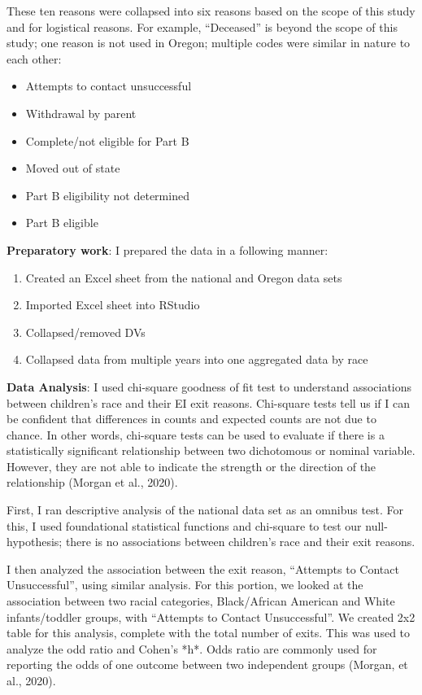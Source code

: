 \documentclass[
  letterpaper,
  DIV=11,
  numbers=noendperiod]{scrartcl}
\providecommand{\tightlist}{%
  \setlength{\itemsep}{0pt}\setlength{\parskip}{0pt}}\usepackage{longtable,booktabs,array}
\begin{document}
These ten reasons were collapsed into six reasons based on the scope of
this study and for logistical reasons. For example, ``Deceased'' is
beyond the scope of this study; one reason is not used in Oregon;
multiple codes were similar in nature to each other:

\begin{itemize}
\tightlist
\item
  Attempts to contact unsuccessful
\item
  Withdrawal by parent
\item
  Complete/not eligible for Part B
\item
  Moved out of state
\item
  Part B eligibility not determined
\item
  Part B eligible
\end{itemize}

\textbf{Preparatory work}: I prepared the data in a following manner:

\begin{enumerate}
\def\labelenumi{\arabic{enumi}.}
\tightlist
\item
  Created an Excel sheet from the national and Oregon data sets
\item
  Imported Excel sheet into RStudio
\item
  Collapsed/removed DVs
\item
  Collapsed data from multiple years into one aggregated data by race
\end{enumerate}

\textbf{Data Analysis}: I used chi-square goodness of fit test to
understand associations between children's race and their EI exit
reasons. Chi-square tests tell us if I can be confident that differences
in counts and expected counts are not due to chance. In other words,
chi-square tests can be used to evaluate if there is a statistically
significant relationship between two dichotomous or nominal variable.
However, they are not able to indicate the strength or the direction of
the relationship (Morgan et al., 2020).

First, I ran descriptive analysis of the national data set as an omnibus
test. For this, I used foundational statistical functions and chi-square
to test our null-hypothesis; there is no associations between children's
race and their exit reasons.

I then analyzed the association between the exit reason, ``Attempts to
Contact Unsuccessful'', using similar analysis. For this portion, we
looked at the association between two racial categories, Black/African
American and White infants/toddler groups, with ``Attempts to Contact
Unsuccessful''. We created 2x2 table for this analysis, complete with
the total number of exits. This was used to analyze the odd ratio and
Cohen's *h*. Odds ratio are commonly used for reporting the odds of one
outcome between two independent groups (Morgan, et al., 2020).
\end{document}

